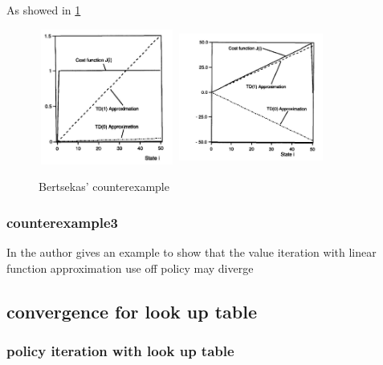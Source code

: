 \documentclass[10pt,a4paper]{article}
\theoremstyle{definition}
\theoremstyle{remark}
\begin{document}
	As showed in \ref{bertsekas}
		\begin{figure} 
			\centering
			\includegraphics[width=1.77in,height=1.75in]{../graph/Bertsekas1.jpg}
			\includegraphics[width=1.87in,height=1.75in]{../graph/Bertsekas2.jpg}
			\caption{Bertsekas' counterexample}
			\label{bertsekas}
		\end{figure}
		
		
	\subsubsection{counterexample3}
	In \cite{Tsitsiklis1996} the author gives an example to show that the value iteration with linear function approximation use off policy may diverge
	

	\subsection{convergence for look up table}
	
		\subsubsection{policy iteration with look up table}


		
\end{document}
